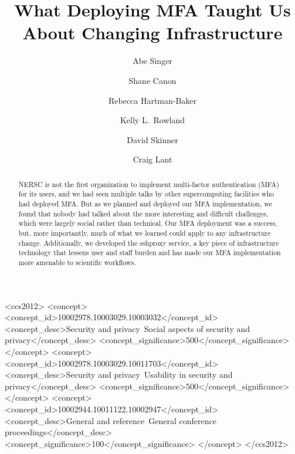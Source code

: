 \documentclass[sigconf,review]{acmart}
\begin{document}
\title{What Deploying MFA Taught Us About Changing Infrastructure}

\author{Abe Singer}

\author{Shane Canon}

\author{Rebecca Hartman-Baker}

\author{Kelly L.\ Rowland}

\author{David Skinner}

\author{Craig Lant}

\begin{abstract}

NERSC is not the first organization to implement multi-factor authentication
(MFA) for its users, and we had seen multiple talks by other supercomputing
facilities who had deployed MFA.  But as we planned and deployed our MFA
implementation, we found that nobody had talked about the more interesting and
difficult challenges, which were largely social rather than technical. Our MFA
deployment was a success, but, more importantly, much of what we learned could
apply to any infrastructure change. Additionally, we developed the sshproxy
service, a key piece of infrastructure technology that lessens user and staff
burden and has made our MFA implementation more amenable to scientific
workflows.

\end{abstract}

\begin{CCSXML}
<ccs2012>
<concept>
<concept_id>10002978.10003029.10003032</concept_id>
<concept_desc>Security and privacy~Social aspects of security and privacy</concept_desc>
<concept_significance>500</concept_significance>
</concept>
<concept>
<concept_id>10002978.10003029.10011703</concept_id>
<concept_desc>Security and privacy~Usability in security and privacy</concept_desc>
<concept_significance>500</concept_significance>
</concept>
<concept>
<concept_id>10002944.10011122.10002947</concept_id>
<concept_desc>General and reference~General conference proceedings</concept_desc>
<concept_significance>100</concept_significance>
</concept>
</ccs2012>
\end{CCSXML}
\end{document}
